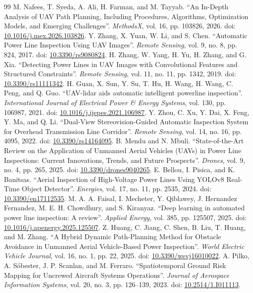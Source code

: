 \documentclass[a4paper,11pt]{article}
\begin{document}
\begin{thebibliography}{99}
M. Nafees, T. Syeda, A. Ali, H. Farman, and M. Tayyab. ``An In-Depth Analysis of UAV Path Planning, Including Procedures, Algorithms, Optimization Models, and Emerging Challenges''. \emph{MethodsX}, vol. 16, pp. 103826, 2026. doi: \url{10.1016/j.mex.2026.103826}.
Y. Zhang, X. Yuan, W. Li, and S. Chen. ``Automatic Power Line Inspection Using UAV Images''. \emph{Remote Sensing}, vol. 9, no. 8, pp. 824, 2017. doi: \url{10.3390/rs9080824}.
H. Zhang, W. Yang, H. Yu, H. Zhang, and G. Xia. ``Detecting Power Lines in UAV Images with Convolutional Features and Structured Constraints''. \emph{Remote Sensing}, vol. 11, no. 11, pp. 1342, 2019. doi: \url{10.3390/rs11111342}.
H. Guan, X. Sun, Y. Su, T. Hu, H. Wang, H. Wang, C. Peng, and Q. Guo. ``UAV-lidar aids automatic intelligent powerline inspection''. \emph{International Journal of Electrical Power \& Energy Systems}, vol. 130, pp. 106987, 2021. doi: \url{10.1016/j.ijepes.2021.106987}.
Y. Zhou, C. Xu, Y. Dai, X. Feng, Y. Ma, and Q. Li. ``Dual-View Stereovision-Guided Automatic Inspection System for Overhead Transmission Line Corridor''. \emph{Remote Sensing}, vol. 14, no. 16, pp. 4095, 2022. doi: \url{10.3390/rs14164095}.
B. Mendu and N. Mbuli. ``State-of-the-Art Review on the Application of Unmanned Aerial Vehicles (UAVs) in Power Line Inspections: Current Innovations, Trends, and Future Prospects''. \emph{Drones}, vol. 9, no. 4, pp. 265, 2025. doi: \url{10.3390/drones9040265}.
E. Bellou, I. Pisica, and K. Banitsas. ``Aerial Inspection of High-Voltage Power Lines Using YOLOv8 Real-Time Object Detector''. \emph{Energies}, vol. 17, no. 11, pp. 2535, 2024. doi: \url{10.3390/en17112535}.
M. A. A. Faisal, I. Mecheter, Y. Qiblawey, J. Hernandez Fernandez, M. E. H. Chowdhury, and S. Kiranyaz. ``Deep learning in automated power line inspection: A review''. \emph{Applied Energy}, vol. 385, pp. 125507, 2025. doi: \url{10.1016/j.apenergy.2025.125507}.
Z. Huang, C. Jiang, C. Shen, B. Liu, T. Huang, and M. Zhang. ``A Hybrid Dynamic Path-Planning Method for Obstacle Avoidance in Unmanned Aerial Vehicle-Based Power Inspection''. \emph{World Electric Vehicle Journal}, vol. 16, no. 1, pp. 22, 2025. doi: \url{10.3390/wevj16010022}.
A. Pilko, A. S{\'o}bester, J. P. Scanlan, and M. Ferraro. ``Spatiotemporal Ground Risk Mapping for Uncrewed Aircraft Systems Operations''. \emph{Journal of Aerospace Information Systems}, vol. 20, no. 3, pp. 126--139, 2023. doi: \url{10.2514/1.I011113}.

\end{thebibliography}
\end{document}
